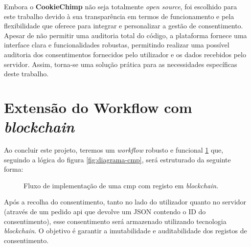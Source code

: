 Embora o \textbf{CookieChimp} não seja totalmente \textit{open source}, foi escolhido para este trabalho devido à sua transparência em termos de funcionamento e pela flexibilidade que oferece para integrar e personalizar a gestão de consentimento. Apesar de não permitir uma auditoria total do código, a plataforma fornece uma interface clara e funcionalidades robustas, permitindo realizar uma possível auditoria dos consentimentos fornecidos pelo utilizador e os dados recebidos pelo servidor. Assim, torna-se uma solução prática para as necessidades específicas deste trabalho.

\section{Extensão do Workflow com \textit{blockchain}}

Ao concluir este projeto, teremos um \textit{workflow} robusto e funcional \ref{fig:diagrama-cmp-2} que, seguindo a lógica do figura \ref{fig:diagrama-cmp}, será estruturado da seguinte forma:

\begin{figure}[h]
\centering
{}
\caption{Fluxo de implementação de uma \acrshort{cmp} com registo em \textit{blockchain}.}
\label{fig:diagrama-cmp-2}
\end{figure}


Após a recolha do consentimento, tanto no lado do utilizador quanto no servidor (através de um pedido \acrfull{api} que devolve um JSON contendo o ID do consentimento), esse consentimento será armazenado utilizando tecnologia \textit{blockchain}. O objetivo é garantir a imutabilidade e auditabilidade dos registos de consentimento.

